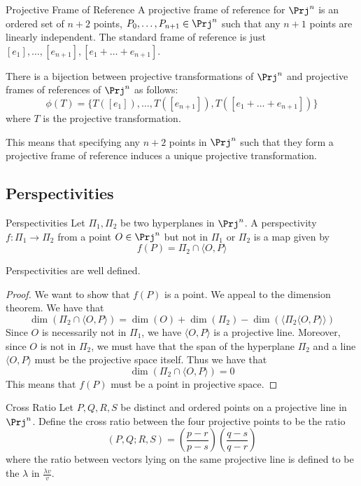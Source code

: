 \documentclass[a4paper]{article}
\begin{document}
\begin{defn}{Projective Frame of Reference}{} A projective frame of reference for $\Prj^n$ is an ordered set of $n+2$ points, $P_0,\dots,P_{n+1}\in\Prj^n$ such that any $n+1$ points are linearly independent. The standard frame of reference is just $[e_1],\dots,[e_{n+1}],[e_1+\dots+e_{n+1}]$. 
\end{defn}

\begin{prp}{}{} There is a bijection between projective transformations of $\Prj^n$ and projective frames of references of $\Prj^n$ as follows: $$\phi(T)=\{T([e_1]),\dots,T([e_{n+1}]),T([e_1+\dots+e_{n+1}])\}$$ where $T$ is the projective transformation. 
\end{prp}

This means that specifying any $n+2$ points in $\Prj^n$ such that they form a projective frame of reference induces a unique projective transformation. 

\subsection{Perspectivities}
\begin{defn}{Perspectivities}{} Let $\Pi_1,\Pi_2$ be two hyperplanes in $\Prj^n$. A perspectivity $f:\Pi_1\to\Pi_2$ from a point $O\in\Prj^n$ but not in $\Pi_1$ or $\Pi_2$ is a map given by $$f(P)=\Pi_2\cap\langle O,P\rangle$$
\end{defn}

\begin{lmm}{}{} Perspectivities are well defined. 
\begin{proof}
We want to show that $f(P)$ is a point. We appeal to the dimension theorem. We have that $$\dim(\Pi_2\cap\langle O,P\rangle)=\dim(O)+\dim(\Pi_2)-\dim(\langle\Pi_2\langle O,P\rangle\rangle)$$ Since $O$ is necessarily not in $\Pi_1$, we have $\langle O,P\rangle$ is a projective line. Moreover, since $O$ is not in $\Pi_2$, we must have that the span of the hyperplane $\Pi_2$ and a line $\langle O,P\rangle$ must be the projective space itself. Thus we have that $$\dim(\Pi_2\cap\langle O,P\rangle)=0$$ This means that $f(P)$ must be a point in projective space. 
\end{proof}
\end{lmm}

\begin{defn}{Cross Ratio}{} Let $P,Q,R,S$ be distinct and ordered points on a projective line in $\Prj^n$. Define the cross ratio between the four projective points to be the ratio $$(P,Q;R,S)=\left(\frac{p-r}{p-s}\right)\left(\frac{q-s}{q-r}\right)$$ where the ratio between vectors lying on the same projective line is defined to be the $\lambda$ in $\frac{\lambda v}{v}$. 
\end{defn}
\end{document}

